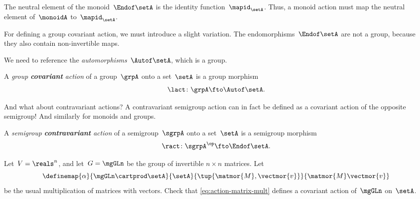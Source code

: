 The neutral element of the monoid~$\Endof\setA$ is the identity function~$\mapid_{\setA}$.
Thus, a monoid action must map the neutral element of~$\monoidA$ to~$\mapid_{\setA}$.
%

For defining a group covariant action, we must introduce a slight variation.
The endomorphisms~$\Endof\setA$ are not a group, because they also contain non-invertible maps.

We need to reference the \emph{automorphisms}~$\Autof\setA$, which is a group.

\begin{ctdefinition}
    \label{def:group-cov-action}
    A \emph{group \textbf{covariant} action} of a group~$\grpA$ onto a set~$\setA$ is a group morphism
    \begin{equation}
        \label{eq:act-group}
        \lact \colon \grpA \fto \Autof\setA.
    \end{equation}
\end{ctdefinition}

And what about contravariant actions?
A contravariant semigroup action can in fact be defined as a covariant action of the opposite semigroup!
And similarly for monoids and groups.

\begin{ctdefinition}
    \label{def:semigroup-cont-action}
    A \emph{semigroup \textbf{contravariant} action} of a semigroup~$\sgrpA$ onto a set~$\setA$ is a semigroup morphism
    \begin{equation}
        \ract \colon \sgrpA^{\op} \fto \Endof\setA.
    \end{equation}
\end{ctdefinition}

\vfill%


\begin{gradedexercise}
    \label{ex:MatrixMultAction}
    Let~$V = \reals^n$, and let~$G = \mgGLn$ be the group of invertible $n \times n$ matrices.
    Let
    \begin{equation}
        \label{eq:action-matrix-mult}
        \definemap{
            \alpha
        }{
            \mgGLn \cartprod \setA
        }{
            \setA
        }{
            \tup{\matmor{M}, \vectmor{v}}
        }{
            \matmor{M}\vectmor{v}
        }
    \end{equation}
    be the usual multiplication of matrices with vectors.
    Check that \cref{eq:action-matrix-mult} defines a covariant action of~$\mgGLn$ on~$\setA$.
\end{gradedexercise}

